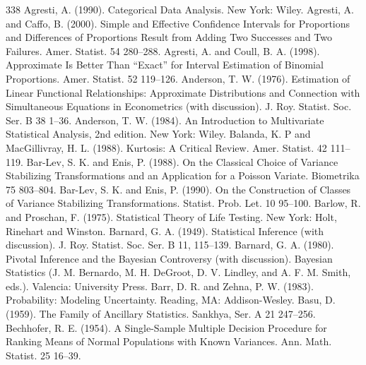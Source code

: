 \clearpage\renewcommand{\refname}{参考文献}
\label{app:references}
\begin{thebibliography}{338}
\small\setlength{\itemsep}{3pt plus 1pt minus 1pt}
\label{bib:source1} Agresti, A. (1990). Categorical Data Analysis. New York: Wiley.
\label{bib:source2} Agresti, A. and Caffo, B. (2000). Simple and Effective Confidence Intervals for Proportions and Differences of Proportions Result from Adding Two Successes and Two Failures. Amer. Statist. 54 280–288.
\label{bib:source3} Agresti, A. and Coull, B. A. (1998). Approximate Is Better Than “Exact” for Interval Estimation of Binomial Proportions. Amer. Statist. 52 119–126.
\label{bib:source4} Anderson, T. W. (1976). Estimation of Linear Functional Relationships: Approximate Distributions and Connection with Simultaneous Equations in Econometrics (with discussion). J. Roy. Statist. Soc. Ser. B 38 1–36.
\label{bib:source5} Anderson, T. W. (1984). An Introduction to Multivariate Statistical Analysis, 2nd edition. New York: Wiley.
\label{bib:source6} Balanda, K. P and MacGillivray, H. L. (1988). Kurtosis: A Critical Review. Amer. Statist. 42 111–119.
\label{bib:source7} Bar-Lev, S. K. and Enis, P. (1988). On the Classical Choice of Variance Stabilizing Transformations and an Application for a Poisson Variate. Biometrika 75 803–804.
\label{bib:source8} Bar-Lev, S. K. and Enis, P. (1990). On the Construction of Classes of Variance Stabilizing Transformations. Statist. Prob. Let. 10 95–100.
\label{bib:source9} Barlow, R. and Proschan, F. (1975). Statistical Theory of Life Testing. New York: Holt, Rinehart and Winston.
\label{bib:source10} Barnard, G. A. (1949). Statistical Inference (with discussion). J. Roy. Statist. Soc. Ser. B 11, 115–139.
\label{bib:source11} Barnard, G. A. (1980). Pivotal Inference and the Bayesian Controversy (with discussion). Bayesian Statistics (J. M. Bernardo, M. H. DeGroot, D. V. Lindley, and A. F. M. Smith, eds.). Valencia: University Press.
\label{bib:source12} Barr, D. R. and Zehna, P. W. (1983). Probability: Modeling Uncertainty. Reading, MA: Addison-Wesley.
\label{bib:source13} Basu, D. (1959). The Family of Ancillary Statistics. Sankhya, Ser. A 21 247–256.
\label{bib:source14} Bechhofer, R. E. (1954). A Single-Sample Multiple Decision Procedure for Ranking Means of Normal Populations with Known Variances. Ann. Math. Statist. 25 16–39.

\end{thebibliography}
